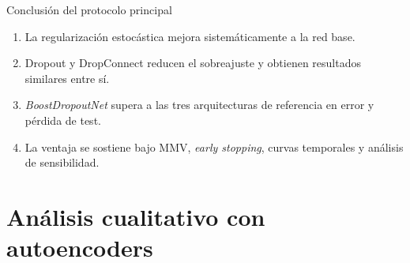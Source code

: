 \documentclass[aspectratio=169,11pt]{beamer}
\newcommand{\model}[1]{\textit{#1}}
\newcommand{\bdn}{\model{BoostDropoutNet}}
\begin{document}
\begin{frame}{Conclusión del protocolo principal}
\large
\begin{enumerate}
  \item La regularización estocástica mejora sistemáticamente a la red base.
  \item Dropout y DropConnect reducen el sobreajuste y obtienen resultados similares entre sí.
  \item \bdn{} supera a las tres arquitecturas de referencia en error y pérdida de test.
  \item La ventaja se sostiene bajo MMV, \textit{early stopping}, curvas temporales y análisis de sensibilidad.
\end{enumerate}
\end{frame}

\section{Análisis cualitativo con autoencoders}
\end{document}
